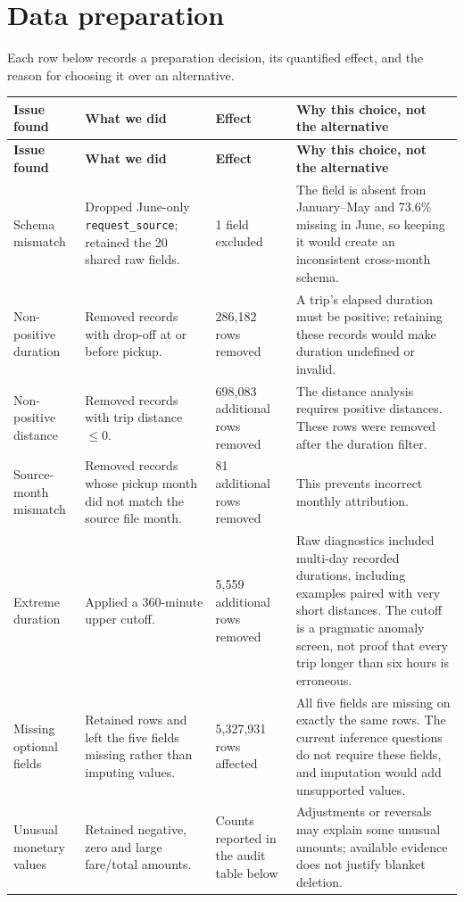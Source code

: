 \documentclass[10pt,a4paper]{article}
\newcommand{\code}[1]{\texttt{#1}}
\begin{document}
\clearpage
\section{Data preparation}
Each row below records a preparation decision, its quantified effect, and the reason for choosing it over an alternative.
\small
\begin{longtable}{@{}L{2.5cm}L{3.8cm}L{2.0cm}L{8.0cm}@{}}
\toprule
\textbf{Issue found} & \textbf{What we did} & \textbf{Effect} & \textbf{Why this choice, not the alternative}\\
\midrule
\endfirsthead
\toprule
\textbf{Issue found} & \textbf{What we did} & \textbf{Effect} & \textbf{Why this choice, not the alternative}\\
\midrule
\endhead
Schema mismatch & Dropped June-only \code{request\_source}; retained the 20 shared raw fields. & 1 field excluded & The field is absent from January--May and 73.6\% missing in June, so keeping it would create an inconsistent cross-month schema.\\
Non-positive duration & Removed records with drop-off at or before pickup. & 286,182 rows removed & A trip's elapsed duration must be positive; retaining these records would make duration undefined or invalid.\\
Non-positive distance & Removed records with trip distance $\leq 0$. & 698,083 additional rows removed & The distance analysis requires positive distances. These rows were removed after the duration filter.\\
Source-month mismatch & Removed records whose pickup month did not match the source file month. & 81 additional rows removed & This prevents incorrect monthly attribution.\\
Extreme duration & Applied a 360-minute upper cutoff. & 5,559 additional rows removed & Raw diagnostics included multi-day recorded durations, including examples paired with very short distances. The cutoff is a pragmatic anomaly screen, not proof that every trip longer than six hours is erroneous.\\
Missing optional fields & Retained rows and left the five fields missing rather than imputing values. & 5,327,931 rows affected & All five fields are missing on exactly the same rows. The current inference questions do not require these fields, and imputation would add unsupported values.\\
Unusual monetary values & Retained negative, zero and large fare/total amounts. & Counts reported in the audit table below & Adjustments or reversals may explain some unusual amounts; available evidence does not justify blanket deletion.\\
\bottomrule
\end{longtable}
\normalsize
\end{document}
